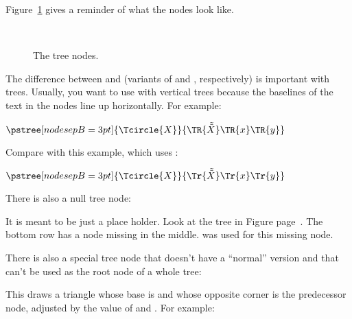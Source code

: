 \documentclass[11pt,english,BCOR10mm,DIV12,bibliography=totoc,parskip=false,smallheadings
    headexclude,footexclude,oneside]{pst-doc}
\begin{document}
Figure~\ref{allnodes} gives a reminder of what the nodes look like.

\begin{figure}[!htb]
\begin{LTXexample}
  \small
  \def\s#1{#1~{\tt\string#1}}\def\b#1{#1{\tt\string#1}}\def\psedge#1#2{\ncangle{#2}{#1}}
    \s\Tp{}~{\tt\string\Tc} \s\TC
    \psTree[levelsep=4cm,armB=2cm]{\Tp[edge=\ncline]}
      \b\Tcircle \s\Tdot
      \TCircle[radius=1.2]{\tt\string\TCircle}
      \Tn \b\Toval \b\Ttri \b\Tdia
    \endpsTree
    \s\Tf \b\Tr \b\TR
  \endpsTree
\end{LTXexample}
\caption{The tree nodes.}\label{allnodes}
\end{figure}

The difference between  and  (variants of  and ,
respectively) is important with trees. Usually, you want to use  with
vertical trees because the baselines of the text in the nodes line up
horizontally. For example:
\begin{LTXexample}[pos=l]
   $
   \pstree[nodesepB=3pt]{\Tcircle{X}}{%
     \TR{\tilde{\tilde{X}}}
     \TR{x}
     \TR{y}}
   $
\end{LTXexample}
Compare with this example, which uses :
\begin{LTXexample}[pos=l]
   $
   \pstree[nodesepB=3pt]{\Tcircle{X}}{%
     \Tr{\tilde{\tilde{X}}}
     \Tr{x}
     \Tr{y}}
   $
\end{LTXexample}

There is also a null tree node: 
\begin{BDef}
\end{BDef}
It is meant to be just a place holder. Look at the tree in Figure
page~\pageref{allnodes}. The bottom row has a node missing in the middle.
\Largb{} was used for this missing node. 

There is also a special tree node that doesn't have a ``normal'' version and
that can't be used as the root node of a whole tree:
\begin{BDef}
\OptArgs 
\end{BDef}
This draws a triangle whose base is  %
and whose opposite corner is the predecessor node, adjusted by the value of
 and .
For example:
\begin{LTXexample}[pos=l]
\end{LTXexample}
\end{document}
